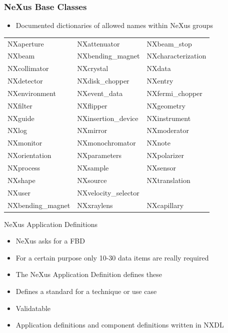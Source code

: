 \documentclass{beamer}
\begin{document}
\begin{frame}
\frametitle{NeXus Base Classes}
\begin{itemize}
\item Documented dictionaries of allowed names within NeXus groups 
\end{itemize}
\begin{tabular}{lll}
NXaperture & NXattenuator & NXbeam\_stop \\
NXbeam     & NXbending\_magnet & NXcharacterization \\
NXcollimator & NXcrystal & NXdata \\
NXdetector   & NXdisk\_chopper & NXentry \\
NXenvironment & NXevent\_data & NXfermi\_chopper \\
NXfilter & NXflipper & NXgeometry \\
NXguide & NXinsertion\_device & NXinstrument \\
NXlog & NXmirror & NXmoderator \\
NXmonitor & NXmonochromator & NXnote \\
NXorientation & NXparameters & NXpolarizer\\
NXprocess & NXsample & NXsensor \\
NXshape & NXsource & NXtranslation\\
NXuser & NXvelocity\_selector & \\
NXbending\_magnet & NXxraylens &NXcapillary\\
\end{tabular}
\end{frame}

\begin{frame}{NeXus Application Definitions}
\begin{itemize}
\item<1-> NeXus asks for a FBD
\item<1-> For a certain purpose only 10-30 data items are really required
\item<2-> The NeXus Application Definition defines these
\item<2-> Defines a standard for a technique or use case
\item<2-> Validatable
\item<3-> Application definitions and component definitions written in NXDL
\end{itemize}
\end{frame}
\end{document}
